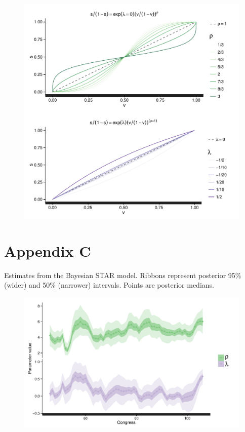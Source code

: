 \begin{figure}[h]
\centering
	\includegraphics[scale=0.8]{sections/figs/seats_votes}
\label{fig:seats_votes}
\end{figure}


\clearpage
\chapter[Parameter estimates]{Appendix C}\label{AppendixC}

Estimates from the Bayesian STAR model. Ribbons represent posterior 95\% (wider) and 50\% (narrower) intervals. Points are posterior medians. 

\begin{figure}[h]
\centering
	\includegraphics[scale=0.8]{sections/figs/lambda_rho}
\label{fig:lambda_rho}
\end{figure}

